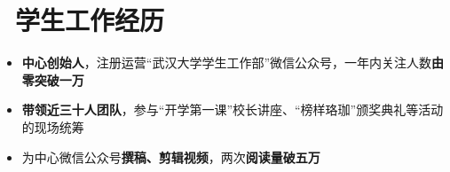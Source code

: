 \documentclass{resume}
\begin{document}





\section{\faSlideshare\ 学生工作经历}
\begin{itemize}
  \item \textbf{中心创始人}，注册运营``武汉大学学生工作部''微信公众号，一年内关注人数\textbf{由零突破一万}
  \item \textbf{带领近三十人团队}，参与``开学第一课''校长讲座、``榜样珞珈''颁奖典礼等活动的现场统筹
  \item 为中心微信公众号\textbf{撰稿、剪辑视频}，两次\textbf{阅读量破五万}
\end{itemize}
\end{document}
